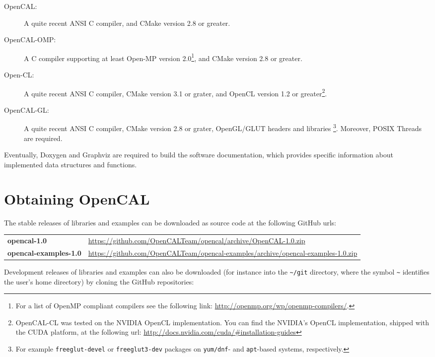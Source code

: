 \begin{description}
\item[OpenCAL: ] A quite recent ANSI C compiler, and CMake version 2.8
  or greater.
\item[OpenCAL-OMP: ] A C compiler supporting at least Open-MP version
  2.0\footnote{For a list of OpenMP compliant compilers see the
    following link: \url{http://openmp.org/wp/openmp-compilers/}.},
  and CMake version 2.8 or greater.
\item[Open-CL: ] A quite recent ANSI C compiler, CMake version 3.1 or
  grater, and OpenCL version 1.2 or greater\footnote{OpenCAL-CL was
    tested on the NVIDIA OpenCL implementation. You can find the
    NVIDIA's OpenCL implementation, shipped with the CUDA platform, at
    the following url:
    \url{http://docs.nvidia.com/cuda/\#installation-guides}}.
\item[OpenCAL-GL: ] A quite recent ANSI C compiler, CMake version 2.8
  or grater, OpenGL/GLUT headers and libraries \footnote{For
  example \texttt{freeglut-devel} or \texttt{freeglut3-dev} packages
  on \texttt{yum/dnf}- and \texttt{apt}-based systems,
  respectively.}. Moreover, POSIX Threads are required.
\end{description}

\noindent Eventually, Doxygen and Graphviz are required to build the
software documentation, which provides specific information about
implemented data structures and functions.

\section{Obtaining OpenCAL}

The stable releases of libraries and examples can be downloaded as source code at the
following GitHub urls:

\begin{table}[h]
  \centering
  \begin{tabularx}{\textwidth}{lX}
    \textbf{opencal-1.0} & \url{https://github.com/OpenCALTeam/opencal/archive/OpenCAL-1.0.zip}\\
    \textbf{opencal-examples-1.0} & \url{https://github.com/OpenCALTeam/opencal-examples/archive/opencal-examples-1.0.zip}\\
  \end{tabularx}
\end{table}

\noindent Development releases of libraries and examples can also be
downloaded (for instance into the \verb'~/git' directory, where the
symbol \verb'~' identifies the user's home directory) by cloning the
GitHub repositories:

